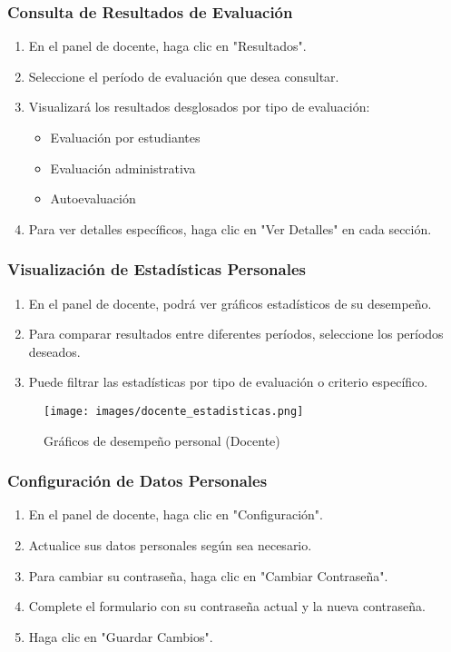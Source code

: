 \documentclass[12pt,a4paper]{article}
\begin{document}
\subsubsection{Consulta de Resultados de Evaluación}
\begin{enumerate}
    \item En el panel de docente, haga clic en "Resultados".
    \item Seleccione el período de evaluación que desea consultar.
    \item Visualizará los resultados desglosados por tipo de evaluación:
    \begin{itemize}
        \item Evaluación por estudiantes
        \item Evaluación administrativa
        \item Autoevaluación
    \end{itemize}
    \item Para ver detalles específicos, haga clic en "Ver Detalles" en cada sección.
\end{enumerate}

\subsubsection{Visualización de Estadísticas Personales}
\begin{enumerate}
    \item En el panel de docente, podrá ver gráficos estadísticos de su desempeño.
    \item Para comparar resultados entre diferentes períodos, seleccione los períodos deseados.
    \item Puede filtrar las estadísticas por tipo de evaluación o criterio específico.
\end{enumerate}

\begin{figure}[H]
  \centering
  \texttt{[image: images/docente\_estadisticas.png]}
  \caption{Gráficos de desempeño personal (Docente)}
  \label{fig:docente_stats}
\end{figure}


\subsubsection{Configuración de Datos Personales}
\begin{enumerate}
    \item En el panel de docente, haga clic en "Configuración".
    \item Actualice sus datos personales según sea necesario.
    \item Para cambiar su contraseña, haga clic en "Cambiar Contraseña".
    \item Complete el formulario con su contraseña actual y la nueva contraseña.
    \item Haga clic en "Guardar Cambios".
\end{enumerate}
\end{document}
